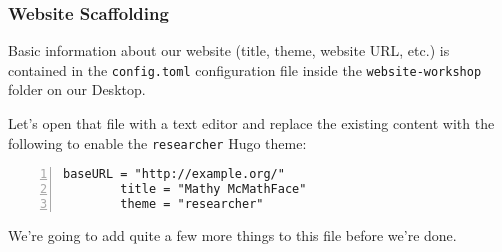 \begin{frame}[fragile]
    \frametitle{Website Scaffolding}

    Basic information about our website (title, theme, website URL, etc.) is contained in the \texttt{config.toml} 
    configuration file inside the \texttt{website-workshop} folder on our Desktop. 
    
    \medskip

    Let's open that file with a text editor and replace the existing content with the following to enable the
    \texttt{researcher} Hugo theme:

    \bigskip

    \begin{lstlisting}[style=saneCode,gobble=8,title={config.toml},numbers=left]
        baseURL = "http://example.org/"
        title = "Mathy McMathFace"
        theme = "researcher"
    \end{lstlisting}

    \vfill

    We're going to add quite a few more things to this file before we're done.
\end{frame}